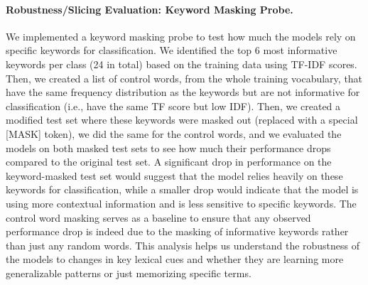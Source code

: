 \paragraph{Robustness/Slicing Evaluation: Keyword Masking Probe.}
We implemented a keyword masking probe to test how much the models rely on specific keywords for classification. We identified the top 6 most informative keywords per class (24 in total) based on the training data using TF-IDF scores. Then, we created a list of control words, from the whole training vocabulary, that have the same frequency distribution as the keywords but are not informative for classification (i.e., have the same TF score but low IDF). Then, we created a modified test set where these keywords were masked out (replaced with a special [MASK] token), we did the same for the control words, and we evaluated the models on both masked test sets to see how much their performance drops compared to the original test set. A significant drop in performance on the keyword-masked test set would suggest that the model relies heavily on these keywords for classification, while a smaller drop would indicate that the model is using more contextual information and is less sensitive to specific keywords. The control word masking serves as a baseline to ensure that any observed performance drop is indeed due to the masking of informative keywords rather than just any random words. This analysis helps us understand the robustness of the models to changes in key lexical cues and whether they are learning more generalizable patterns or just memorizing specific terms.



